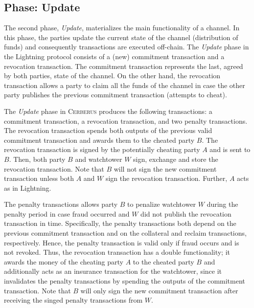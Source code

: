 \documentclass[runningheads]{llncs}
\newcommand{\sys}{\textsc{Cerberus}\xspace}
\begin{document}
\vspace{-22pt}
\subsection{Phase: Update}\label{subsec:update}

The second phase, \textit{Update}, %
materializes the main functionality of a channel. In this phase, the parties update the current state of the channel (distribution of funds) and consequently transactions are executed off-chain. The \textit{Update} phase in the Lightning protocol consists of a (new) commitment transaction and a revocation transaction. The commitment transaction represents the last, agreed by both parties, state of the channel. On the other hand, the revocation transaction allows a party to claim all the funds of the channel in case the other party publishes the previous commitment transaction (attempts to cheat). 

The \textit{Update} phase in \sys produces the following transactions: a commitment transaction, a revocation transaction, and two penalty transactions. 
The revocation transaction spends both outputs of the previous valid commitment transaction and awards them to the cheated party $B$. 
The revocation transaction is signed by the potentially cheating party $A$ and is sent to $B$.
Then, both party $B$ and watchtower $W$ sign, exchange and store the revocation transaction. 
Note that $B$ will not sign the new commitment transaction unless both $A$ and $W$ sign the revocation transaction.
Further, $A$ acts as in Lightning.

The penalty transactions allows party $B$ to penalize watchtower $W$ during the penalty period in case fraud occurred and $W$ did not publish the revocation transaction in time. 
Specifically, the penalty transactions both depend on the previous commitment transaction and on the collateral and reclaim transactions, respectively. Hence, the penalty transaction is valid only if fraud occurs and is not revoked.
Thus, the revocation transaction has a double functionality; it awards the money of the cheating party $A$ to the cheated party $B$ and additionally acts as an insurance transaction for the watchtower, since it invalidates the penalty transactions by spending the outputs of the commitment transaction.
Note that $B$ will only sign the new commitment transaction after receiving the singed penalty transactions from $W$.
\end{document}
